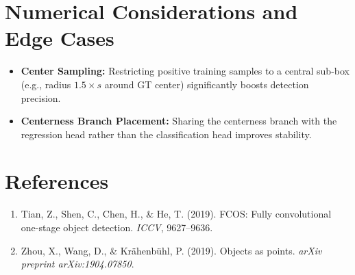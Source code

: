 \documentclass[11pt,a4paper]{article}
\theoremstyle{definition}
\begin{document}
\section{Numerical Considerations and Edge Cases}

\begin{itemize}
    \item \textbf{Center Sampling:} Restricting positive training samples to a central sub-box (e.g., radius $1.5 \times s$ around GT center) significantly boosts detection precision.
    \item \textbf{Centerness Branch Placement:} Sharing the centerness branch with the regression head rather than the classification head improves stability.
\end{itemize}

\section{References}
\begin{enumerate}
    \item Tian, Z., Shen, C., Chen, H., & He, T. (2019). FCOS: Fully convolutional one-stage object detection. \emph{ICCV}, 9627--9636.
    \item Zhou, X., Wang, D., & Kr{\"a}henb{\"u}hl, P. (2019). Objects as points. \emph{arXiv preprint arXiv:1904.07850}.
\end{enumerate}
\end{document}
